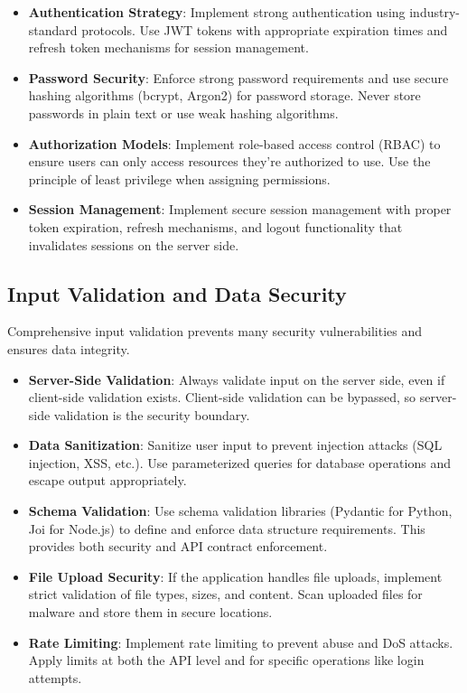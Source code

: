 \documentclass[12pt]{article}
\begin{document}
\begin{itemize}
    \item \textbf{Authentication Strategy}: Implement strong authentication using industry-standard protocols. Use JWT tokens with appropriate expiration times and refresh token mechanisms for session management.
    
    \item \textbf{Password Security}: Enforce strong password requirements and use secure hashing algorithms (bcrypt, Argon2) for password storage. Never store passwords in plain text or use weak hashing algorithms.
    
    \item \textbf{Authorization Models}: Implement role-based access control (RBAC) to ensure users can only access resources they're authorized to use. Use the principle of least privilege when assigning permissions.
    
    \item \textbf{Session Management}: Implement secure session management with proper token expiration, refresh mechanisms, and logout functionality that invalidates sessions on the server side.
\end{itemize}

\subsection{Input Validation and Data Security}
Comprehensive input validation prevents many security vulnerabilities and ensures data integrity.

\begin{itemize}
    \item \textbf{Server-Side Validation}: Always validate input on the server side, even if client-side validation exists. Client-side validation can be bypassed, so server-side validation is the security boundary.
    
    \item \textbf{Data Sanitization}: Sanitize user input to prevent injection attacks (SQL injection, XSS, etc.). Use parameterized queries for database operations and escape output appropriately.
    
    \item \textbf{Schema Validation}: Use schema validation libraries (Pydantic for Python, Joi for Node.js) to define and enforce data structure requirements. This provides both security and API contract enforcement.
    
    \item \textbf{File Upload Security}: If the application handles file uploads, implement strict validation of file types, sizes, and content. Scan uploaded files for malware and store them in secure locations.
    
    \item \textbf{Rate Limiting}: Implement rate limiting to prevent abuse and DoS attacks. Apply limits at both the API level and for specific operations like login attempts.
\end{itemize}
\end{document}
